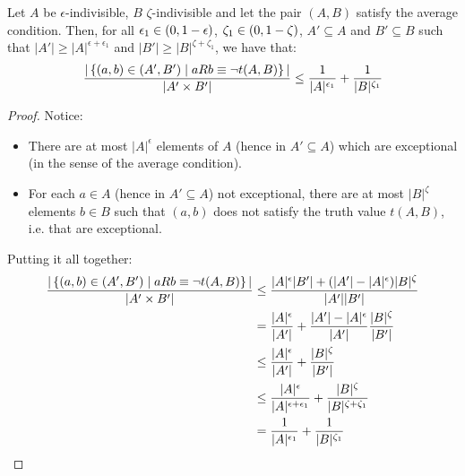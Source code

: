     \begin{lemma}[Claim 4.8] \label{exceptions_bound_of_epsilon_indivisible_sets}
        Let $A$ be $\epsilon$-indivisible, $B$ $\zeta$-indivisible and let the pair $(A,B)$ satisfy the average condition.
        Then, for all $\epsilon_1 \in \left( 0, 1-\epsilon \right)$, $\zeta_1 \in \left( 0, 1-\zeta \right)$, $A' \subseteq A$
            and $B' \subseteq B$ such that $|A'| \geq |A|^{\epsilon + \epsilon_1}$ and $|B'| \geq |B|^{\zeta + \zeta_1}$,
            we have that:
        \[
            \frac{|\left\{ (a,b) \in (A',B') \mid a R b \equiv \neg t(A,B) \right\}|}{|A' \times B'|} \leq
                \frac{1}{|A|^{\epsilon_1}} + \frac{1}{|B|^{\zeta_1}}
        \]
        \begin{proof}
            Notice:
            \begin{itemize}
                \item There are at most $|A|^\epsilon$ elements of $A$ (hence in $A' \subseteq A$) which are exceptional
                    (in the sense of the average condition).
                \item For each $a \in A$ (hence in $A' \subseteq A$) not exceptional, there are at most $|B|^\zeta$ elements
                    $b \in B$ such that $(a,b)$ does not satisfy the truth value $t(A,B)$, i.e. that are exceptional.
            \end{itemize}
            Putting it all together:
            \[
                \begin{split}
                    \frac{|\left\{ (a,b) \in (A',B') \mid a R b \equiv \neg t(A,B) \right\}|}{|A' \times B'|}
                        &\leq \frac{|A|^\epsilon |B'| + (|A'| - |A|^\epsilon) |B|^\zeta}{|A'| |B'|} \\
                        &= \frac{|A|^\epsilon}{|A'|} + \frac{|A'| - |A|^\epsilon}{|A'|} \frac{|B|^\zeta}{|B'|} \\
                        &\leq \frac{|A|^\epsilon}{|A'|} + \frac{|B|^\zeta}{|B'|} \\
                        &\leq \frac{|A|^\epsilon}{|A|^{\epsilon + \epsilon_1}} + \frac{|B|^\zeta}{|B|^{\zeta + \zeta_1}} \\
                        &= \frac{1}{|A|^{\epsilon_1}} + \frac{1}{|B|^{\zeta_1}}
                \end{split}
            \]
        \end{proof}
    \end{lemma}

